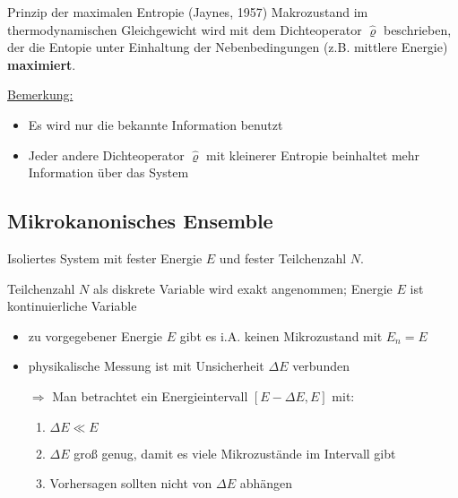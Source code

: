 \begin{prop}{Prinzip der maximalen Entropie (Jaynes, 1957)}
    Makrozustand im thermodynamischen Gleichgewicht wird mit dem Dichteoperator $\hat{\varrho}$ beschrieben, der die Entopie unter Einhaltung der Nebenbedingungen (z.B. mittlere Energie) \textbf{maximiert}.
\end{prop}

\underline{Bemerkung:}
\begin{itemize}
    \item Es wird nur die bekannte Information benutzt
    \item Jeder andere Dichteoperator $\hat{\varrho}$ mit kleinerer Entropie beinhaltet mehr Information über das System
\end{itemize}

\subsection{Mikrokanonisches Ensemble}\label{seq.Mikrokanonisches_ensemble}
Isoliertes System mit fester Energie $E$ und fester Teilchenzahl $N$.
\begin{center}
\end{center}

Teilchenzahl $N$ als diskrete Variable wird exakt angenommen; Energie $E$ ist kontinuierliche Variable
\begin{itemize}
    \item zu vorgegebener Energie $E$ gibt es i.A. keinen Mikrozustand mit $E_n = E$
    \item physikalische Messung ist mit Unsicherheit $\Delta E$ verbunden
    \item[$\Rightarrow$] Man betrachtet ein Energieintervall $[E-\Delta E,E]$ mit:
    \begin{enumerate}
        \item $\Delta E \ll E$
        \item $\Delta E$ groß genug, damit es viele Mikrozustände im Intervall gibt
        \item Vorhersagen sollten nicht von $\Delta E$ abhängen
    \end{enumerate}
\end{itemize}


